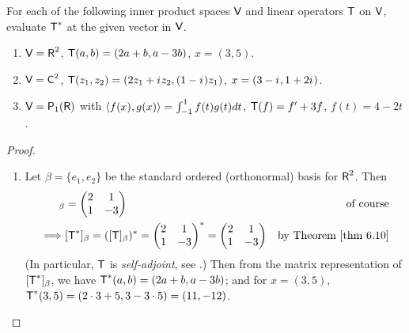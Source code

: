 \begin{exercise} \label{exercise 6.3.3}
For each of the following inner product spaces \(\textsf{V}\) and linear operators \(\textsf{T}\) on \(\textsf{V}\), evaluate \(\textsf{T}^*\) at the given vector in \(\textsf{V}\).
\begin{enumerate}
\item \(\textsf{V} = \textsf{R}^2\), \(\textsf{T}(a, b) = (2a + b, a - 3b)\), \(x = (3, 5)\).
\item \(\textsf{V} = \textsf{C}^2\), \(\textsf{T}(z_1, z_2) = (2z_1 + {i\mkern1mu} z_2, (1 - {i\mkern1mu})z_1)\), \(x = (3 - {i\mkern1mu}, 1 + 2{i\mkern1mu})\).
\item \(\textsf{V} = \textsf{P}_1(\textsf{R})\) with \(\left< f(x),g(x) \right> = \int_{-1}^1 f(t) g(t) dt\), \(\textsf{T}(f) = f' + 3f\), \(f(t) = 4 - 2t\).
\end{enumerate}
\end{exercise}

\begin{proof} \ 

\begin{enumerate}
\item Let \(\beta = \{ e_1, e_2 \}\) be the standard ordered (orthonormal) basis for \(\textsf{R}^2\).
Then
\begin{align*}
    [\T]_{\beta} & = \begin{pmatrix} 2 & 1 \\ 1 & -3 \end{pmatrix} & \text{of course} \\
    \implies & [\T^*]_{\beta} = ([\T]_{\beta})^* = \begin{pmatrix} 2 & 1 \\ 1 & -3 \end{pmatrix}^* = \begin{pmatrix} 2 & 1 \\ 1 & -3 \end{pmatrix} & \text{by \THM{6.10}}
\end{align*}
(In particular, \(\textsf{T}\) is \emph{self-adjoint}, see .)
Then from the matrix representation of \([\textsf{T}^*]_{\beta}\), we have \(\textsf{T}^*(a, b) = (2a + b, a - 3b)\); and for \(x = (3, 5)\), \(\textsf{T}^*(3, 5) = (2 \cdot 3 + 5, 3 - 3 \cdot 5) = (11, -12)\).


\end{enumerate}
\end{proof}
